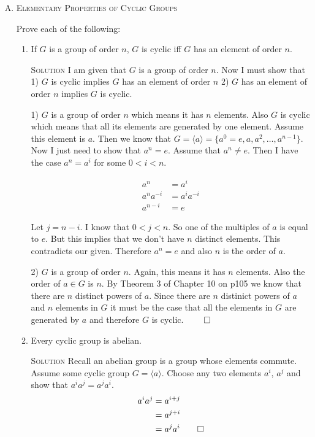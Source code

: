 \documentclass[twoside]{amsart}
\newcommand{\solution}{\textsc{Solution}\xspace}
\newcommand{\blank}{\vspace{5pt}}
\newcommand{\itm}{\blank\item}
\newcommand{\sol}{\blank\noindent\solution}
\begin{document}
\begin{enumerate}[A.]
   \itm \textsc{Elementary Properties of Cyclic Groups}

   \noindent Prove each of the following:

   \begin{enumerate}[1)]

      \itm If $G$ is a group of order $n$, $G$ is cyclic iff $G$ has an 
      element of order $n$.

      \sol I am given that $G$ is a group of order $n$. Now I must
      show that 1) $G$ is cyclic implies $G$ has an element of order $n$ 
      2) $G$ has an element of order $n$ implies $G$ is cyclic.

      1) $G$ is a group of order $n$ which means it has $n$ elements. 
      Also $G$ is cyclic which means that all its elements are generated
      by one element. Assume this element is $a$. Then we know that
      $G = \langle a \rangle = \{a^0=e,a,a^2,\ldots,a^{n-1}\}$. Now
      I just need to show that $a^n = e$. Assume that $a^n \ne e$.
      Then I have the case $a^n = a^i$ for some $0 < i < n$.

      \begin{align*}
         a^n &= a^i \\
         a^na^{-i} &= a^ia^{-i} \\
         a^{n-i} &= e
      \end{align*}

      Let $j = n-i$. I know that $0 < j < n$. So one of the multiples of
      $a$ is equal to $e$. But this implies that we don't have $n$ distinct
      elements. This contradicts our given. Therefore $a^n = e$ and also
      $n$ is the order of $a$.

      2) $G$ is a group of order $n$. Again, this means it has $n$ elements.
      Also the order of $a \in G$ is $n$. By Theorem 3 of Chapter 10 on p105
      we know that there are $n$ distinct powers of $a$. Since there
      are $n$ distinict powers of $a$ and $n$ elements in $G$ it must be
      the case that all the elements in $G$ are generated by $a$ and
      therefore $G$ is cyclic. $\qed$

      \itm Every cyclic group is abelian.

      \sol Recall an abelian group is a group whose elements 
      commute. Assume some cyclic group $G = \langle a \rangle$. Choose
      any two elements $a^i$, $a^j$ and show that $a^i a^j = a^j a^i$.
      \begin{align*}
         a^i a^j &= a^{i+j} \\
                 &= a^{j+i} \\
                 &= a^j a^i \qed
      \end{align*}


\end{enumerate}
\end{enumerate}
\end{document}
